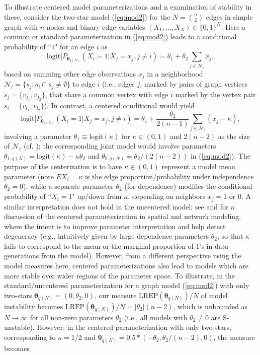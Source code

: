\documentclass[numbib]{imamat}
\theoremstyle{theorem}
\theoremstyle{lemma}
\theoremstyle{example}
\theoremstyle{corollary}
\theoremstyle{definition}
\theoremstyle{remark}
\theoremstyle{approximation}
\theoremstyle{scheme}
\newcommand{\REP}{\mathrm{LREP}}
\newcommand{\thetaidx}{q(N)}
\newcommand{\thetaN}{\boldsymbol \theta_{\thetaidx}}
\newcommand{\ak}[1]{{\color{blue} #1}}
\begin{document}
\ak{To illustrate centered model parameterizations and n examination of stability in these, consider the two-star model (\ref{eq:mod2}) for the $N = {n \choose 2}$ edges in simple graph with $n$ nodes and binary edge-variables $(X_1,\ldots,X_N)\in\{0,1\}^N$. Here a common or standard parameterization in (\ref{eq:mod2}) leads to a conditional probability of ``$1$" for an edge $i$ as
$$
\mathrm{logit}[  P_{\thetaN}(X_{i} = 1 | X_j=x_j, j\neq i)=  \theta_1 + \theta_2 \sum_{j \in \mathcal{N}_i } x_j,$$ 
based on summing other edge observations $x_j$ in a neighborhood $\mathcal{N}_i = \{{s}_j: {s}_i \cap {s}_j \neq \emptyset\}$ to edge $i$ (i.e., edges $j$,  marked by pairs of graph vertices ${s}_{j} = \{ v_{j_1}, v_{j_2} \}$, that share a common vertex with edge $i$ marked by the vertex pair ${s}_i =\{v_{i_1}, v_{i_2}\}$).  In contrast, a centered conditional would yield 
$$
\mathrm{logit}[  P_{\thetaN}(X_{i} = 1 | X_j=x_j, j\neq i)=  \theta_1 +  \frac{\theta_2}{2(n-1)}\sum_{j \in \mathcal{N}_i} (x_{j}-\kappa),
$$
involving a parameter $\theta_1 \equiv \mathrm{logit}(\kappa)$ for $\kappa \in (0,1)$ and $2(n-2)$ as the size of $\mathcal{N}_i$ (cf. \citep{kaiser2009exploring}); the corresponding joint model would involve parameters $\theta_{1,\thetaidx}= \mathrm{logit}(\kappa) - \kappa\theta_2$
and $\theta_{2,\thetaidx} = \theta_2/(2(n-2))$ in (\ref{eq:mod2}). The purpose of the centerization is to have $\kappa \in(0,1)$ represent a model mean parameter (note $E X_i =\kappa$ is the edge proportion/probability under independence $\theta_2=0$), while a separate parameter $\theta_2$ (for dependence) modifies the conditional probability of ``$X_i=1$" up/down from $\kappa$, depending on neighbors $x_j=1$ or 0.  A similar interpretation does not hold in the uncentered model; see \citep{kaiser2009exploring} and \citep{casleton2017local} for a discussion of the centered parameterization in spatial and network modeling, where the intent is to improve parameter interpretation and help detect degeneracy (e.g., intuitively given by large dependence parameters $\theta_2$, so that $\kappa$ fails to correspond to the mean or the marginal proportion of $1$'s in data generations from the model).  However, from a different perspective using the model measures here, centered parameterizations also lead to models which are more stable over wider regions of the parameter space. To illustrate, in the standard/uncentered parameterization for a graph model (\ref{eq:mod2}) with only two-stars $\thetaN = (0,\theta_2,0)$, our measure $\REP(\thetaN)/N$ of model instability becomes $\REP(\thetaN)/N = |\theta_2| (n-2)$, which is unbounded as $N\to \infty$ for all non-zero parameters $\theta_2$ (i.e., all models with $\theta_2\neq 0$ are S-unstable).  However, in the centered parameterization  with only two-stars, corresponding to $\kappa=1/2$ and $\thetaN= 0.5*(-\theta_2,\theta_2/(n-2),0)$, the measure becomes
}
\end{document}
